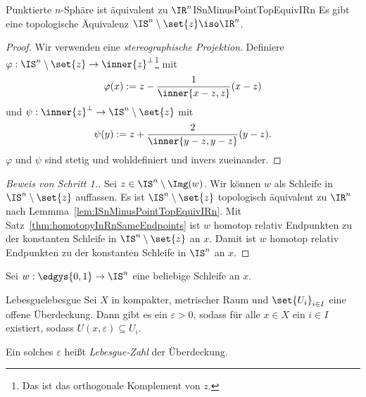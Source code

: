 \documentclass[language=ngerman]{TemplateLecture} %
\begin{document}
\begin{lem}{Punktierte $n$-Sphäre ist äquivalent zu $\IR^n$}{ISnMinusPointTopEquivIRn}
    Es gibt eine topologische Äquivalenz $\IS^n \setminus \set{z} \iso \IR^n$.
\end{lem}
\begin{proof}
    Wir verwenden eine \emph{stereographische Projektion}. Definiere $\varphi: \IS^n \setminus \set{z} \to \inner{z}^\perp$\footnote{Das ist das orthogonale Komplement von $z$.} mit 
    \begin{equation*}
        \varphi(x) := z - \frac{1}{\inner{x-z, z}}(x-z)
    \end{equation*}
    und $\psi: \inner{z}^\perp \to \IS^n \setminus \set{z}$ mit 
    \begin{equation*}
        \psi(y) := z + \frac{2}{\inner{y - z, y - z}}(y - z).
    \end{equation*}
    $\varphi$ und $\psi$ sind stetig und wohldefiniert und invers zueinander.
\end{proof}
\begin{proof}[Beweis von Schritt 1.]
    Sei $z \in \IS^n \setminus \Img(w)$. Wir können $w$ als Schleife in $\IS^n \setminus \set{z}$ auffassen. Es ist $\IS^n \setminus \set{z}$ topologisch äquivalent zu $\IR^n$ nach Lemmma~\ref{lem:ISnMinusPointTopEquivIRn}. Mit Satz~\ref{thm:homotopyInRnSameEndpoints} ist $w$ homotop relativ Endpunkten zu der konstanten Schleife in $\IS^n \setminus \set{z}$ an $x$. Damit ist $w$ homotop relativ Endpunkten zu der konstanten Schleife in $\IS^n$ an $x$.
\end{proof}

Sei $w: \edgys{0,1} \to \IS^n$ eine beliebige Schleife an $x$.

\begin{lem}{Lebesgue}{lebesgue}
    Sei $X$ in kompakter, metrischer Raum und $\set{U_i}_{i \in I}$ eine offene Überdeckung. Dann gibt es ein $\varepsilon > 0$, sodass für alle $x \in X$ ein $i \in I$ existiert, sodass $U(x, \varepsilon) \subseteq U_i$.
\end{lem}
Ein solches $\varepsilon$ heißt \emph{Lebesgue-Zahl} der Überdeckung.
\end{document}
